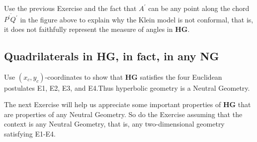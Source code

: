 \documentclass{ximera}
\begin{document}
\begin{exercise}
 Use the previous Exercise and the fact that $A^{\prime}$ can be
any point along the chord $\overline{P^{\prime}Q^{\prime}}$ in the figure
above to explain why the Klein model is not conformal, that is, it does not
faithfully represent the measure of angles in \textbf{HG}.
\end{exercise}

\subsection*{Quadrilaterals in HG, in fact, in any NG}

\begin{exercise}
 Use $\left( x_{c},y_{c}\right) $-coordinates to show that \textbf{HG}
 satisfies the four Euclidean postulates E1, E2, E3, and E4.Thus
 hyperbolic geometry is a Neutral Geometry.
\end{exercise}

The next Exercise will help us appreciate some important properties of
\textbf{HG} that are properties of any Neutral Geometry. So do the Exercise
assuming that the context is any Neutral Geometry, that is, any
two-dimensional geometry satisfying E1-E4.
\end{document}
